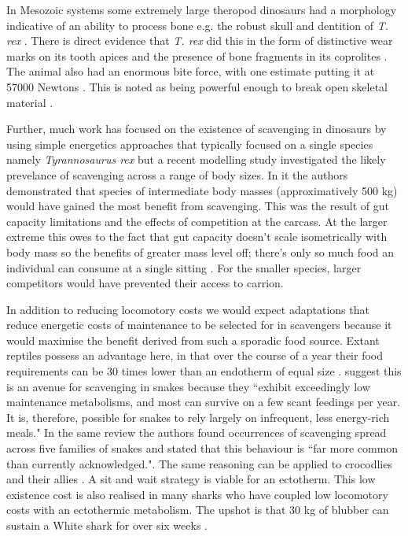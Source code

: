 \documentclass[a4paper,12pt]{article}
\begin{document}
In Mesozoic systems some extremely large theropod dinosaurs had a morphology indicative of an ability to process bone e.g. the robust skull and dentition of \textit{T. rex} \citep{hone2010feeding}.
There is direct evidence that \textit{T. rex} did this in the form of distinctive wear marks on its tooth apices \citep{farlow1994wear,schubert2005wear} and the presence of bone fragments in its coprolites \citep{chin1998king}.
The animal also had an enormous bite force, with one estimate putting it at 57000 Newtons \citep{bates2012estimating}.
This is noted as being powerful enough to break open skeletal material \citep{rayfield2001cranial}.

Further, much work has focused on the existence of scavenging in dinosaurs by using simple energetics approaches that typically focused on a single species namely \textit{Tyrannosaurus rex} \citep{ruxton2003could,carbone2011intra} but a recent modelling study investigated the likely prevelance of scavenging across a range of body sizes.
In it the authors demonstrated that species of intermediate body masses (approximatively 500 kg) would have gained the most benefit from scavenging.
This was the result of gut capacity limitations and the effects of competition at the carcass.
At the larger extreme this owes to the fact that gut capacity doesn't scale isometrically with body mass so the benefits of greater mass level off; there's only so much food an individual can consume at a single sitting \citep{calder1996size}.
For the smaller species, larger competitors would have prevented their access to carrion.

In addition to reducing locomotory costs we would expect adaptations that reduce energetic costs of maintenance to be selected for in scavengers because it would maximise the benefit derived from such a sporadic food source. 
Extant reptiles possess an advantage here, in that over the course of a year their food requirements can be 30 times lower than an endotherm of equal size \citep{Nagy1621}.
\cite{devault2002scavenging} suggest this is an avenue for scavenging in snakes because they ``exhibit  exceedingly  low  maintenance  metabolisms,  and most  can  survive  on  a  few  scant  feedings per year.
It  is, therefore, possible for snakes to rely largely  on  infrequent,  less  energy-rich  meals." In the same review the authors found occurrences of scavenging spread across five families of snakes and stated that this behaviour is ``far more common than currently acknowledged."\citep{devault2002scavenging}.
The same reasoning can be applied to crocodlies and their allies \citep{forrest2003evidence}. 
A sit and wait strategy is viable for an ectotherm. 
This low existence cost is also realised in many sharks who have coupled low locomotory costs with an ectothermic metabolism. 
The upshot is that 30 kg of blubber can sustain a White shark for over six weeks \citep{carey1982temperature}. 
\end{document}
